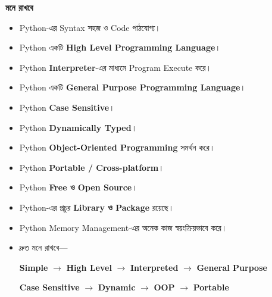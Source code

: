 
\begin{rememberbox}

\textbf{\color{deepOrange}মনে রাখবে}

\begin{itemize}

\item
Python-এর Syntax সহজ ও Code পাঠযোগ্য।

\item
Python একটি
\textbf{High Level Programming Language}।

\item
Python
\textbf{Interpreter}-এর মাধ্যমে Program Execute করে।

\item
Python একটি
\textbf{General Purpose Programming Language}।

\item
Python
\textbf{Case Sensitive}।

\item
Python
\textbf{Dynamically Typed}।

\item
Python
\textbf{Object-Oriented Programming}
সমর্থন করে।

\item
Python
\textbf{Portable / Cross-platform}।

\item
Python
\textbf{Free ও Open Source}।

\item
Python-এর প্রচুর
\textbf{Library ও Package}
রয়েছে।

\item
Python Memory Management-এর অনেক কাজ
স্বয়ংক্রিয়ভাবে করে।

\item
দ্রুত মনে রাখবে—

\begin{center}

\textbf{Simple}
\(\longrightarrow\)
\textbf{High Level}
\(\longrightarrow\)
\textbf{Interpreted}
\(\longrightarrow\)
\textbf{General Purpose}

\medskip

\textbf{Case Sensitive}
\(\longrightarrow\)
\textbf{Dynamic}
\(\longrightarrow\)
\textbf{OOP}
\(\longrightarrow\)
\textbf{Portable}

\end{center}

\end{itemize}

\end{rememberbox}

\small


